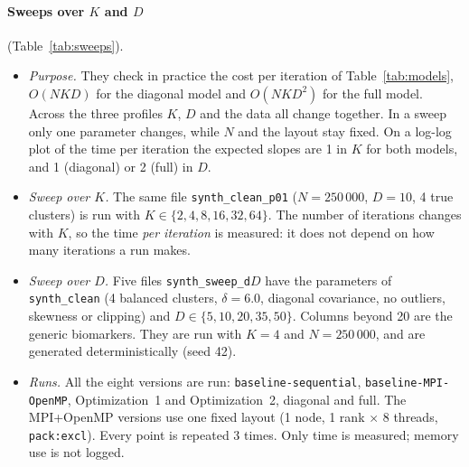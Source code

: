 \documentclass[conference,onecolumn]{IEEEtran}
\newcommand{\vseq}{\texttt{baseline-\allowbreak sequential}}
\newcommand{\vbase}{\texttt{baseline-\allowbreak MPI-\allowbreak OpenMP}}
\begin{document}
\paragraph{Sweeps over $K$ and $D$}\label{sec:sweeps} (Table~\ref{tab:sweeps}).
\begin{itemize}
\item \emph{Purpose.} They check in practice the cost per iteration of Table~\ref{tab:models}, $O(NKD)$ for the diagonal model and $O(NKD^2)$ for the full model. Across the three profiles $K$, $D$ and the data all change together. In a sweep only one parameter changes, while $N$ and the layout stay fixed. On a log-log plot of the time per iteration the expected slopes are 1 in $K$ for both models, and 1 (diagonal) or 2 (full) in $D$.
\item \emph{Sweep over $K$.} The same file \texttt{synth\_clean\_p01} ($N=250\,000$, $D=10$, 4 true clusters) is run with $K\in\{2,4,8,16,32,64\}$. The number of iterations changes with $K$, so the time \emph{per iteration} is measured: it does not depend on how many iterations a run makes.
\item \emph{Sweep over $D$.} Five files \texttt{synth\_sweep\_d}$D$ have the parameters of \texttt{synth\_clean} (4 balanced clusters, $\delta=6.0$, diagonal covariance, no outliers, skewness or clipping) and $D\in\{5,10,20,35,50\}$. Columns beyond 20 are the generic biomarkers. They are run with $K=4$ and $N=250\,000$, and are generated deterministically (seed 42).
\item \emph{Runs.} All the eight versions are run: \vseq{}, \vbase{}, Optimization~1 and Optimization~2, diagonal and full. The MPI+OpenMP versions use one fixed layout (1 node, 1 rank $\times$ 8 threads, \texttt{pack:excl}). Every point is repeated 3 times. Only time is measured; memory use is not logged.
\end{itemize}
\end{document}
